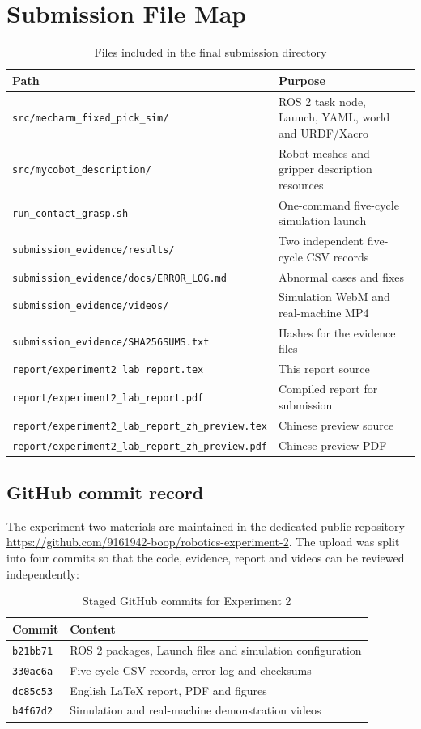 \documentclass[11pt,a4paper]{article}
\newcommand{\code}[1]{\texttt{\footnotesize #1}}
\begin{document}
\section{Submission File Map}
\begin{table}[H]
\centering\small
\caption{Files included in the final submission directory}
\begin{tabularx}{\textwidth}{>{\ttfamily\scriptsize\raggedright\arraybackslash}p{}X}
\toprule
Path & Purpose\\
\midrule
\code{src/mecharm\_fixed\_pick\_sim/} & ROS 2 task node, Launch, YAML, world and URDF/Xacro\\
\code{src/mycobot\_description/} & Robot meshes and gripper description resources\\
\code{run\_contact\_grasp.sh} & One-command five-cycle simulation launch\\
\code{submission\_evidence/results/} & Two independent five-cycle CSV records\\
\code{submission\_evidence/docs/ERROR\_LOG.md} & Abnormal cases and fixes\\
\code{submission\_evidence/videos/} & Simulation WebM and real-machine MP4\\
\code{submission\_evidence/SHA256SUMS.txt} & Hashes for the evidence files\\
\code{report/experiment2\_lab\_report.tex} & This report source\\
\code{report/experiment2\_lab\_report.pdf} & Compiled report for submission\\
\code{report/experiment2\_lab\_report\_zh\_preview.tex} & Chinese preview source\\
\code{report/experiment2\_lab\_report\_zh\_preview.pdf} & Chinese preview PDF\\
\bottomrule
\end{tabularx}
\end{table}

\subsection{GitHub commit record}
The experiment-two materials are maintained in the dedicated public repository
\url{https://github.com/9161942-boop/robotics-experiment-2}. The upload was split into four commits so that the code, evidence, report and videos can be reviewed independently:
\begin{table}[H]
\centering\small
\caption{Staged GitHub commits for Experiment 2}
\begin{tabular}{ll}
\toprule
Commit & Content\\
\midrule
\code{b21bb71} & ROS 2 packages, Launch files and simulation configuration\\
\code{330ac6a} & Five-cycle CSV records, error log and checksums\\
\code{dc85c53} & English LaTeX report, PDF and figures\\
\code{b4f67d2} & Simulation and real-machine demonstration videos\\
\bottomrule
\end{tabular}
\end{table}
\end{document}

